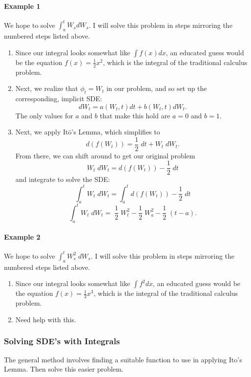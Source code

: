 \documentclass[12pt]{article}
\theoremstyle{plain}
\theoremstyle{definition}
\theoremstyle{remark}
\begin{document}
\paragraph{Example 1} We hope to solve $\int^t_a W_s dW_s$. I will
solve this problem in steps mirroring the numbered steps listed above.
\begin{enumerate}
   \item{Since our integral looks somewhat like $\int f(x) dx$, an
      educated guess would be the equation $f(x) = \frac{1}{2} x^2$,
      which is the integral of the traditional calculus problem.
      }
   \item{Next, we realize that $\phi_t = W_t$ in our problem, and
      so set up the corresponding, implicit SDE:
      \[ dW_t = a(W_t, t) dt + b(W_t, t) dW_t.\]
      The only values for $a$ and $b$ that make this hold are $a=0$
      and $b=1$.
      }
   \item{Next, we apply It\={o}'s Lemma, which simplifies to
	 \[d(f(W_t)) = \frac{1}{2}\; dt + W_t \; dW_t. \]
      From there, we can shift around to get our original problem
	 \[W_t \; dW_t= d(f(W_t)) -\frac{1}{2}\; dt \]
      and integrate to solve the SDE:
	 \[ \int^t_a W_t \; dW_t =\int^t_a d(f(W_t))-\frac{1}{2}\;dt\]
	 \[ \int^t_a W_t \; dW_t=\;\frac{1}{2}\;W^2_t-\frac{1}{2}\;W^2_a
	    - \frac{1}{2}\;(t-a).\]
      }
\end{enumerate}

\paragraph{Example 2} We hope to solve $\int^t_a W^2_s\;dW_s$. I will
solve this problem in steps mirroring the numbered steps listed above.
\begin{enumerate}
   \item{Since our integral looks somewhat like $\int f^2 dx$, an
      educated guess would be the equation $f(x) = \frac{1}{3} x^3$,
      which is the integral of the traditional calculus problem.
      }
   \item{Need help with this.}

\end{enumerate}

\subsubsection{Solving SDE's with Integrals}

The general method involves finding a suitable function to use in
applying It{o}'s Lemma. Then solve this easier problem.
\end{document}

